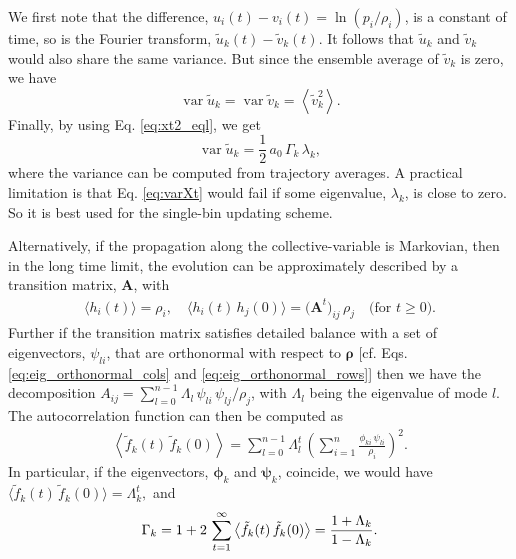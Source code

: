 \documentclass[reprint, superscriptaddress, floatfix]{revtex4-1}
\begin{document}
We first note that the difference,
$u_i(t) - v_i(t) = \ln(p_i/\rho_i)$, is a constant of time,
so is the Fourier transform,
$\tilde u_k(t) - \tilde v_k(t)$.
%
It follows that
${\tilde u}_{k}$ and ${\tilde v}_{k}$ would also share the same variance.
%
But since the ensemble average of ${\tilde v}_{k}$
is zero, we have
\begin{equation*}
  \operatorname{var} {\tilde u}_{k}
  =
  \operatorname{var} {\tilde v}_{k}
  =
  \left\langle {\tilde v}_{k}^2 \right\rangle
  .
\end{equation*}
%
Finally, by using Eq. \eqref{eq:xt2_eql},
we get
%
\begin{equation}
  \operatorname{var} {\tilde u}_k
  =
  \frac{1}{2} \,
  a_0 \, \Gamma_k \, \lambda_k,
\label{eq:varXt}
\end{equation}
%
where the variance can be computed from trajectory averages.
%
A practical limitation is that Eq. \eqref{eq:varXt}
would fail if some eigenvalue, $\lambda_k$, is close to zero.
So it is best used for the single-bin updating scheme.

Alternatively,
if the propagation along the collective-variable is Markovian,
then in the long time limit, the evolution can be approximately
described by a transition matrix, $\mathbf A$, with
\begin{align*}
\langle h_i(t) \rangle = \rho_i,
\quad
\langle h_i(t) \, h_j(0) \rangle = \bigl(\mathbf A^t\bigr)_{ij} \, \rho_j
\quad \mbox{(for $t \ge 0$)}
.
\end{align*}
Further if the transition matrix satisfies detailed balance
with a set of eigenvectors, $\psi_{li}$,
that are orthonormal with respect to $\pmb\rho$
[cf. Eqs. \eqref{eq:eig_orthonormal_cols} and
\eqref{eq:eig_orthonormal_rows}]
then we have the decomposition
$A_{ij} = \sum_{l=0}^{n-1} \Lambda_l \, \psi_{li} \, \psi_{lj} / \rho_j$,
with $\Lambda_l$ being the eigenvalue of mode $l$.
%
The autocorrelation function can then be computed as
%
\begin{align*}
\left\langle
  \tilde f_k(t) \, \tilde f_k(0)
\right\rangle
=
\sum_{l = 0}^{n-1} \Lambda_l^t \,
\left(
  \sum_{i=1}^n \frac{ \phi_{ki} \, \psi_{li} }{ \rho_i }
\right)^2
.
\end{align*}
%
In particular, if the eigenvectors, $\pmb \phi_k$
and $\pmb \psi_k$, coincide,
we would have
$\bigl\langle
  \tilde f_k(t) \, \tilde f_k(0)
\bigr\rangle
=
\Lambda_k^t,$
and
\begin{equation}
  \Gamma_k = 1 + 2 \, \sum_{t=1}^\infty \left\langle
    \tilde f_k(t) \, \tilde f_k(0)
  \right\rangle = \frac{1+\Lambda_k}{1-\Lambda_k}
  .
  \notag
\end{equation}
\end{document}
